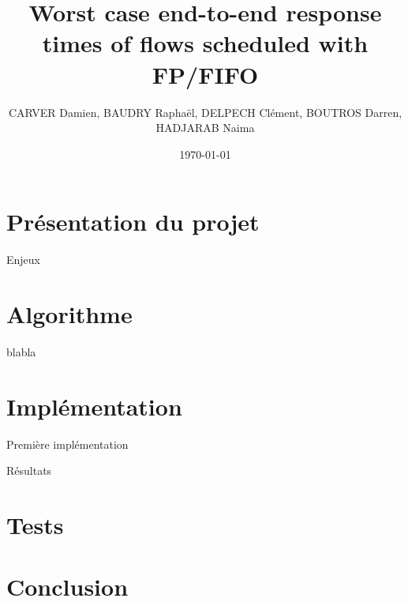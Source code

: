 \documentclass{beamer}
\begin{document}
\title{Worst case end-to-end response times of flows scheduled with FP/FIFO}

\author[]{CARVER Damien, BAUDRY Raphaël, DELPECH Clément, BOUTROS Darren, 
HADJARAB Naima}
\date{\today}
\frame{\titlepage} 

\section{Présentation du projet}
\begin{frame}{Enjeux}

\end{frame}


\section{Algorithme}
\begin{frame}{blabla}
 
\end{frame}


\section{Implémentation}
\begin{frame}{Première implémentation}

\end{frame}

\begin{frame}{Résultats}

\end{frame}


\section{Tests}
\begin{frame}{}

\end{frame}


\section{Conclusion}
\begin{frame}{}

\end{frame}
\end{document}
